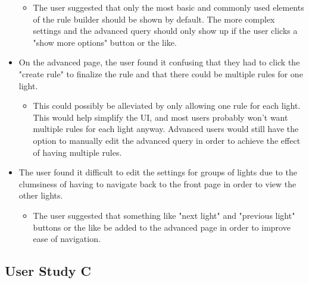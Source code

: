 \documentclass[10pt,draftclsnofoot,onecolumn]{IEEEtran}
\begin{document}
\begin{itemize}
\begin{itemize}
            \item The user suggested that only the most basic and commonly used
                elements of the rule builder should be shown by default.  The
                more complex settings and the advanced query should only show
                up if the user clicks a "show more options" button or the like.
        \end{itemize}
    \item On the advanced page, the user found it confusing that they had to
        click the "create rule" to finalize the rule and that there could be
        multiple rules for one light.
        \begin{itemize}
            \item This could possibly be alleviated by only allowing one rule
                for each light.  This would help simplify the UI, and most
                users probably won't want multiple rules for each light anyway.
                Advanced users would still have the option to manually edit the
                advanced query in order to achieve the effect of having
                multiple rules.
        \end{itemize}
    \item The user found it difficult to edit the settings for groups of lights
        due to the clumsiness of having to navigate back to the front page in
        order to view the other lights.
        \begin{itemize}
            \item The user suggested that something like "next light" and
                "previous light" buttons or the like be added to the advanced
                page in order to improve ease of navigation.
        \end{itemize}
\end{itemize}

\subsection{User Study C}
\end{document}
